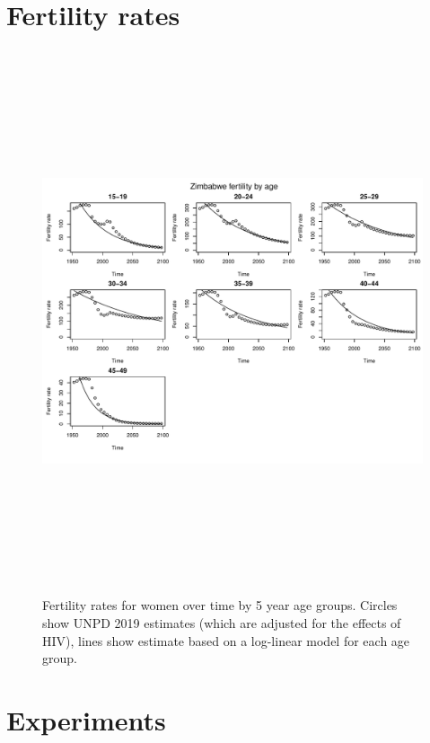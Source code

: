 \documentclass{article}
\begin{document}
\clearpage

\section*{Fertility rates}





\begin{figure}
\includegraphics[width=16cm,height=16cm]{EstimatingRatesFromUNPDv2-Fertility} 

\caption{Fertility rates for women  over time by 5 year age groups. Circles show UNPD 2019 estimates (which are adjusted for the effects of HIV), lines show estimate based on a log-linear model for each age group.}
\label{Fertility}
\end{figure}


\clearpage
\section*{Experiments}
\end{document}
